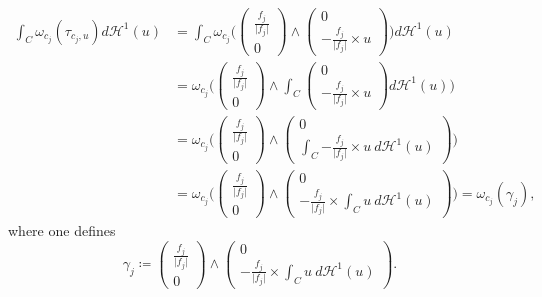 \documentclass[sn-mathphys-num]{sn-jnl}%
\theoremstyle{thmstyleone}%
\theoremstyle{thmstyletwo}%
\theoremstyle{thmstylethree}%
\numberwithin{remark}{section}
\numberwithin{definition}{section}
\numberwithin{equation}{section}
\numberwithin{theorem}{section}
\begin{document}
\begin{align*}
    \int_{C}{\omega_{c_j}(\tau_{c_j,u}) d\mathcal{H}^{1}(u)}
   & = \int_{C}{\omega_{c_j}\bigg(\begin{pmatrix}  \frac{f_j }{\lvert f_j \rvert}\\ 0  \end{pmatrix}\wedge  \begin{pmatrix} 0\\ -\frac{f_j }{\lvert f_j \rvert} \times u  \end{pmatrix}\bigg) d\mathcal{H}^{1}(u)}\\
&    =\omega_{c_j}\bigg(\begin{pmatrix}  \frac{f_j }{\lvert f_j \rvert} \\ 0  \end{pmatrix}\wedge  \int_{C}{\begin{pmatrix} 0\\ -\frac{f_j }{\lvert f_j \rvert} \times u  \end{pmatrix} d\mathcal{H}^{1}(u)}\bigg)\\
    &    =\omega_{c_j}\bigg(\begin{pmatrix} \frac{f_j }{\lvert f_j \rvert} \\ 0  \end{pmatrix}\wedge  \begin{pmatrix} 0\\ \int_{C}{-\frac{f_j }{\lvert f_j \rvert}\times u 
 \ d\mathcal{H}^{1}(u)} \end{pmatrix} \bigg)\\
 &=\omega_{c_j}\bigg(\begin{pmatrix}  \frac{f_j }{\lvert f_j \rvert} \\ 0  \end{pmatrix}\wedge  \begin{pmatrix} 0\\ -\frac{f_j }{\lvert f_j \rvert} \times \int_{C}{ u 
 \ d\mathcal{H}^{1}(u)} \end{pmatrix}\bigg) 
 = \omega_{c_j}(\gamma_j),
\end{align*}
where one defines
\[ 
    \gamma_j\coloneq \begin{pmatrix}  \frac{f_j }{\lvert f_j \rvert} \\ 0  \end{pmatrix}\wedge  \begin{pmatrix} 0\\ -\frac{f_j }{\lvert f_j \rvert} \times \int_{C}{ u 
 \ d\mathcal{H}^{1}(u)} \end{pmatrix}.
\]
\end{document}
